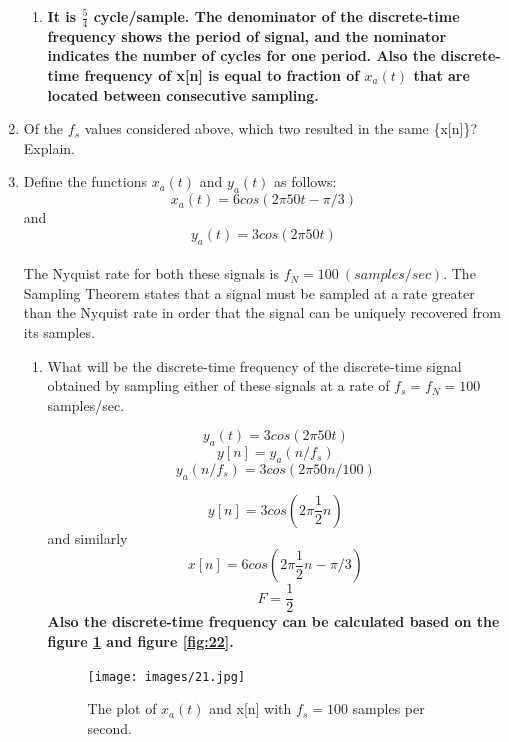 \documentclass[12pt]{article}
\begin{document}
\begin{enumerate}
\begin{enumerate}
\item \textbf{It is $\frac{5}{4}$ cycle/sample. The denominator of the discrete-time frequency shows the period of signal, and the nominator indicates the number of cycles for one period. Also the discrete-time frequency of x[n] is equal to fraction of $x_a(t)$ that are located between consecutive sampling.}
\end{enumerate}


\item Of the $f_s$ values considered above, which two resulted in the same \{x[n]\}? Explain.



\item Define the functions $x_a(t)$ and $y_a(t)$ as follows:\\
$$x_a(t) = 6 cos(2\pi50t - \pi/3)$$ and $$y_a(t) = 3 cos(2\pi50t)$$\\
The Nyquist rate for both these signals is $f_N = 100\ (samples/sec)$. The Sampling Theorem states that a signal must be sampled at a rate greater than the Nyquist rate in order that the signal can be uniquely recovered from its samples.


\begin{enumerate}
\item What will be the discrete-time frequency of the discrete-time signal obtained by sampling either of these signals at a rate of $f_s = f_N = 100$ samples/sec.

$$y_a(t) = 3 cos(2\pi50t)$$
$$y[n] = y_a(n/f_s)$$
$$y_a(n/f_s) = 3 cos(2\pi50n/100)$$

$$y[n] = 3 cos(2\pi\frac{1}{2}n)$$
 and similarly
$$x[n] = 6 cos(2\pi\frac{1}{2}n - \pi/3)$$
\textbf{
$$\boxed{F = \frac{1}{2}}$$
}
\textbf{Also the discrete-time frequency can be calculated based on the figure \ref{fig:21} and figure \ref{fig:22}.}


\begin{figure}[H]
    \centering
    \begin{minipage}[b]{0.7\textwidth}
        \texttt{[image: images/21.jpg]}
    \end{minipage}
    \caption{The plot of $x_a(t)$ and x[n] with $f_s = 100$ samples per second.}
    \label{fig:21}
\end{figure}


\end{enumerate}
\end{enumerate}
\end{document}
